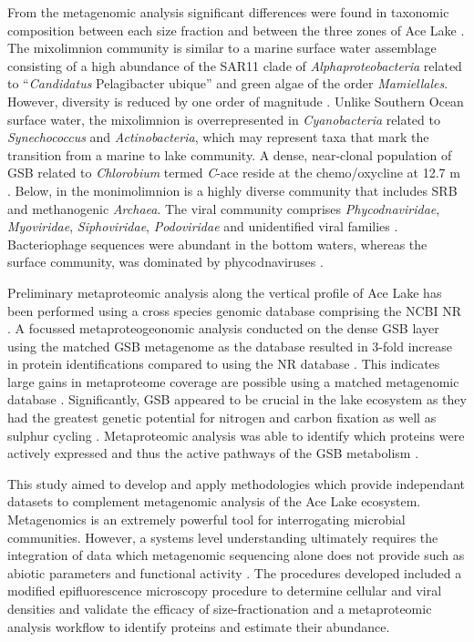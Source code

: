 From the metagenomic analysis significant differences were found in taxonomic composition between each size fraction and between the three zones of Ace Lake \cite{Lauro2011}.
The mixolimnion community is similar to a marine surface water assemblage consisting of a high abundance of the SAR11 clade of \emph{Alphaproteobacteria} related to ``\emph{Candidatus} Pelagibacter ubique'' and green algae of the order \emph{Mamiellales}.
However, diversity is reduced by one order of magnitude \cite{Lauro2011}.
Unlike Southern Ocean surface water, the mixolimnion is overrepresented in \emph{Cyanobacteria} related to \emph{Synechococcus} and \emph{Actinobacteria}, which may represent taxa that mark the transition from a marine to lake community.
A dense, near-clonal population of \ac{GSB} related to \emph{Chlorobium} termed \emph{C}-ace reside at the chemo/oxycline at 12.7 m \cite{Ng2010a, Lauro2011}.
Below, in the monimolimnion is a highly diverse community that includes \ac{SRB} and methanogenic \emph{Archaea}.
The viral community comprises \emph{Phycodnaviridae}, \emph{Myoviridae}, \emph{Siphoviridae}, \emph{Podoviridae} and unidentified viral families \cite{Lauro2011}. 
Bacteriophage sequences were abundant in the bottom waters, whereas the surface community, was dominated by phycodnaviruses \cite{Lauro2011}. 

Preliminary metaproteomic analysis along the vertical profile of Ace Lake has been performed using a cross species genomic database comprising the \ac{NCBI} \ac{NR} \cite{Ng2010b}.
A focussed metaproteogeonomic analysis conducted on the dense \ac{GSB} layer using the matched \ac{GSB} metagenome as the database resulted in 3-fold increase in protein identifications compared to using the \ac{NR} database \cite{Ng2010b}.
This indicates large gains in metaproteome coverage are possible using a matched metagenomic database \cite{Ng2010b}.
Significantly, \ac{GSB} appeared to be crucial in the lake ecosystem as they had the greatest genetic potential for nitrogen and carbon fixation as well as sulphur cycling \cite{Ng2010b, Lauro2011}.
Metaproteomic analysis was able to identify which proteins were actively expressed and thus the active pathways of the \ac{GSB} metabolism \cite{Ng2010a}.

This study aimed to develop and apply methodologies which provide independant datasets to complement metagenomic analysis of the Ace Lake ecosystem.
Metagenomics is an extremely powerful tool for interrogating microbial communities.
However, a systems level understanding ultimately requires the integration of data which metagenomic sequencing alone does not provide such as abiotic parameters and functional activity \cite{Handelsman2008}.
The procedures developed included a modified epifluorescence microscopy procedure to determine cellular and viral densities and validate the efficacy of size-fractionation and a metaproteomic analysis workflow to identify proteins and estimate their abundance.


